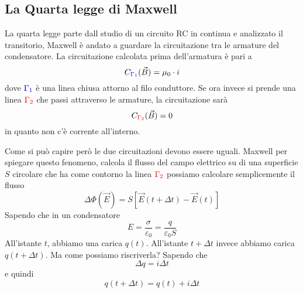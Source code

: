 \subsection{La Quarta legge di Maxwell}
La quarta legge parte dall studio di un circuito RC in continua e analizzato il
transitorio, Maxwell è andato a guardare la circuitazione tra le armature del condensatore.
La circuitazione calcolata prima dell'armatura è pari a
\begin{equation*}
  C_{\mathcolor{blue}{\Gamma_1}}(\vec{B}) = \mu_0\cdot i
\end{equation*}
dove $\mathcolor{blue}{\Gamma_1}$ è una linea chiusa attorno al filo conduttore. Se ora invece si 
prende una linea  $\mathcolor{red}{\Gamma_2}$ che passi attraverso le armature, la circuitazione sarà
\begin{equation*}
  C_{\mathcolor{red}{\Gamma_2}}(\vec{B}) = 0
\end{equation*}
in quanto non c'è corrente all'interno.
\begin{center}
\end{center}
Come si può capire però le due circuitazioni devono essere uguali. Maxwell per spiegare questo 
fenomeno, calcola il flusso del
campo elettrico su di una superficie $S$ circolare che ha come contorno la linea 
$\mathcolor{red}{\Gamma_2}$ possiamo calcolare semplicemente il flusso
\begin{equation*}
  \Delta\Phi(\vec{E}) = S \left[ \vec{E}(t+\Delta t)-\vec{E}(t) \right]
\end{equation*}
Sapendo che in un condensatore
\begin{equation*}
  E = \frac{\sigma}{\varepsilon_0} = \frac{q}{\varepsilon_0 S}
\end{equation*}
All'istante $t$, abbiamo una carica $q(t)$. All'istante $t+\Delta t$ invece abbiamo carica 
$q(t+\Delta t)$. Ma come possiamo riscriverla? Sapendo che
\begin{equation*}
  \Delta q = i\Delta t
\end{equation*}
e quindi 
\begin{equation*}
  q(t+\Delta t) = q(t) + i\Delta t
\end{equation*}
